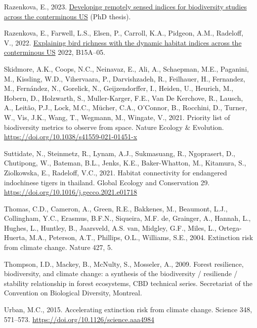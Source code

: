 \documentclass[
]{agujournal2019}
\newlength{\cslhangindent}
\newenvironment{CSLReferences}[2] %
 {\begin{list}{}{%
  \setlength{\itemindent}{0pt}
  \setlength{\leftmargin}{0pt}
  \setlength{\parsep}{0pt}
  \ifodd #1
   \setlength{\leftmargin}{\cslhangindent}
   \setlength{\itemindent}{-1\cslhangindent}
  \fi
  \setlength{\itemsep}{#2\baselineskip}}}
 {\end{list}}
\begin{document}
\begin{CSLReferences}{1}{0}
Razenkova, E., 2023.
\href{https://digital.library.wisc.edu/1711.dl/AHEVJRQOIXB3K83}{‎Developing
remotely sensed indices for biodiversity studies across the conterminous
US} (PhD thesis).

Razenkova, E., Farwell, L.S., Elsen, P., Carroll, K.A., Pidgeon, A.M.,
Radeloff, V., 2022.
\href{https://ui.adsabs.harvard.edu/abs/2022AGUFM.B15A..05R}{Explaining
bird richness with the dynamic habitat indices across the conterminous
US} 2022, B15A--05.

Skidmore, A.K., Coops, N.C., Neinavaz, E., Ali, A., Schaepman, M.E.,
Paganini, M., Kissling, W.D., Vihervaara, P., Darvishzadeh, R.,
Feilhauer, H., Fernandez, M., Fernández, N., Gorelick, N.,
Geijzendorffer, I., Heiden, U., Heurich, M., Hobern, D., Holzwarth, S.,
Muller-Karger, F.E., Van De Kerchove, R., Lausch, A., Leitão, P.J.,
Lock, M.C., Mücher, C.A., O'Connor, B., Rocchini, D., Turner, W., Vis,
J.K., Wang, T., Wegmann, M., Wingate, V., 2021. Priority list of
biodiversity metrics to observe from space. Nature Ecology \& Evolution.
\url{https://doi.org/10.1038/s41559-021-01451-x}

Suttidate, N., Steinmetz, R., Lynam, A.J., Sukmasuang, R., Ngoprasert,
D., Chutipong, W., Bateman, B.L., Jenks, K.E., Baker-Whatton, M.,
Kitamura, S., Ziolkowska, E., Radeloff, V.C., 2021. Habitat connectivity
for endangered indochinese tigers in thailand. Global Ecology and
Conservation 29. \url{https://doi.org/10.1016/j.gecco.2021.e01718}

Thomas, C.D., Cameron, A., Green, R.E., Bakkenes, M., Beaumont, L.J.,
Collingham, Y.C., Erasmus, B.F.N., Siqueira, M.F. de, Grainger, A.,
Hannah, L., Hughes, L., Huntley, B., Jaarsveld, A.S. van, Midgley, G.F.,
Miles, L., Ortega-Huerta, M.A., Peterson, A.T., Phillips, O.L.,
Williams, S.E., 2004. Extinction risk from climate change. Nature 427,
5.

Thompson, I.D., Mackey, B., McNulty, S., Mosseler, A., 2009. Forest
resilience, biodiversity, and climate change: a synthesis of the
biodiversity / resiliende / stability relationship in forest ecosystems,
CBD technical series. Secretariat of the Convention on Biological
Diversity, Montreal.

Urban, M.C., 2015. Accelerating extinction risk from climate change.
Science 348, 571--573. \url{https://doi.org/10.1126/science.aaa4984}


\end{CSLReferences}
\end{document}
